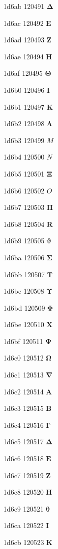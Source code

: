 \documentclass[11pt]{article}
\begin{document}
1d6ab 120491 \ensuremath{\mathbf{\Delta}}

1d6ac 120492 \ensuremath{\mathbf{E}}

1d6ad 120493 \ensuremath{\mathbf{Z}}

1d6ae 120494 \ensuremath{\mathbf{H}}

1d6af 120495 \ensuremath{\mathbf{\Theta}}

1d6b0 120496 \ensuremath{\mathbf{I}}

1d6b1 120497 \ensuremath{\mathbf{K}}

1d6b2 120498 \ensuremath{\mathbf{\Lambda}}

1d6b3 120499 \ensuremath{M}

1d6b4 120500 \ensuremath{N}

1d6b5 120501 \ensuremath{\mathbf{\Xi}}

1d6b6 120502 \ensuremath{O}

1d6b7 120503 \ensuremath{\mathbf{\Pi}}

1d6b8 120504 \ensuremath{\mathbf{R}}

1d6b9 120505 \ensuremath{\mathbf{\vartheta}}

1d6ba 120506 \ensuremath{\mathbf{\Sigma}}

1d6bb 120507 \ensuremath{\mathbf{T}}

1d6bc 120508 \ensuremath{\mathbf{\Upsilon}}

1d6bd 120509 \ensuremath{\mathbf{\Phi}}

1d6be 120510 \ensuremath{\mathbf{X}}

1d6bf 120511 \ensuremath{\mathbf{\Psi}}

1d6c0 120512 \ensuremath{\mathbf{\Omega}}

1d6c1 120513 \ensuremath{\mathbf{\nabla}}

1d6c2 120514 \ensuremath{\mathbf{A}}

1d6c3 120515 \ensuremath{\mathbf{B}}

1d6c4 120516 \ensuremath{\mathbf{\Gamma}}

1d6c5 120517 \ensuremath{\mathbf{\Delta}}

1d6c6 120518 \ensuremath{\mathbf{E}}

1d6c7 120519 \ensuremath{\mathbf{Z}}

1d6c8 120520 \ensuremath{\mathbf{H}}

1d6c9 120521 \ensuremath{\mathbf{\theta}}

1d6ca 120522 \ensuremath{\mathbf{I}}

1d6cb 120523 \ensuremath{\mathbf{K}}
\end{document}
